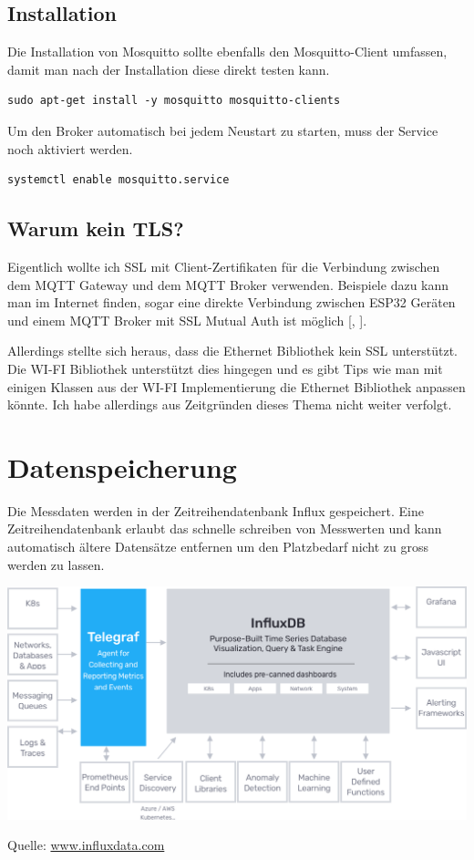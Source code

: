 \documentclass[
  12pt, %
  a4paper, %
  oneside, %
  openany, 
  numbers=noenddot, %
  BCOR=5mm, %
  parskip=half*, %
  thesis, %
]{bfhbook}
\newcommand{\source}[1]{\caption*{Quelle: {#1}} }
\begin{document}
\subsection{Installation}
Die Installation von Mosquitto sollte ebenfalls den Mosquitto-Client umfassen, damit man nach der Installation diese direkt testen kann.
\begin{verbatim}
sudo apt-get install -y mosquitto mosquitto-clients
   \end{verbatim}
 Um den Broker automatisch bei jedem Neustart zu starten, muss der Service noch aktiviert werden.
 \begin{verbatim}
systemctl enable mosquitto.service
 \end{verbatim}
 
 \subsection{Warum kein TLS?}
Eigentlich wollte ich SSL mit Client-Zertifikaten für die Verbindung zwischen dem MQTT Gateway und dem MQTT Broker verwenden. Beispiele dazu kann man im Internet finden, sogar eine direkte Verbindung zwischen ESP32 Geräten und einem MQTT Broker mit SSL Mutual Auth ist möglich [\cite{espssl}, \cite{mosquittoSSL}].

Allerdings stellte sich heraus, dass die Ethernet Bibliothek kein SSL unterstützt. Die WI-FI Bibliothek unterstützt dies hingegen und es gibt Tips wie man mit einigen Klassen aus der WI-FI Implementierung die Ethernet Bibliothek anpassen könnte. Ich habe allerdings aus Zeitgründen dieses Thema nicht weiter verfolgt.
\section{Datenspeicherung}
Die Messdaten werden in der Zeitreihendatenbank Influx \cite{influx} gespeichert. Eine Zeitreihendatenbank erlaubt das schnelle schreiben von Messwerten und kann automatisch ältere Datensätze entfernen um den Platzbedarf nicht zu gross werden zu lassen.
  \begin{center}
    \includegraphics[width=\textwidth, valign=t]{Bilder/InfluxDB-2.png}
    \captionsetup{justification=centering}
    \source{\url{www.influxdata.com}}
   \end{center}
\end{document}
